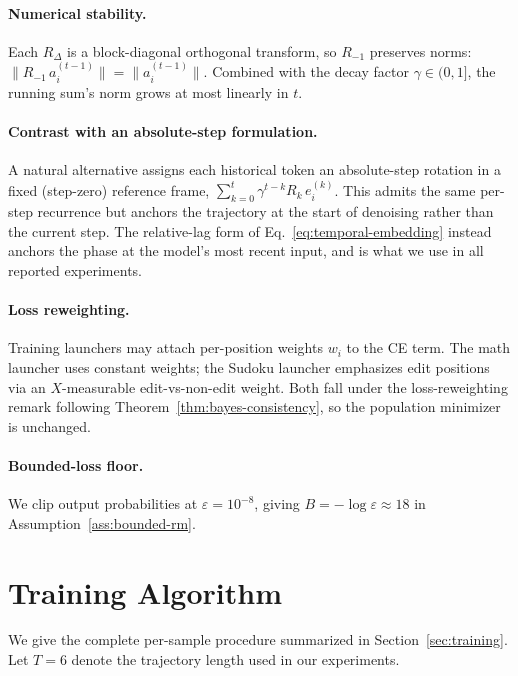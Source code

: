\documentclass{llmxive}
\begin{document}
\paragraph{Numerical stability.}
Each $R_\Delta$ is a block-diagonal orthogonal transform, so $R_{-1}$ preserves norms: $\|R_{-1}\, a_i^{(t-1)}\| = \|a_i^{(t-1)}\|$. Combined with the decay factor $\gamma \in (0, 1]$, the running sum's norm grows at most linearly in $t$.

\paragraph{Contrast with an absolute-step formulation.}
A natural alternative assigns each historical token an absolute-step rotation in a fixed (step-zero) reference frame, $\sum_{k=0}^{t} \gamma^{t-k} R_k\, e_i^{(k)}$. This admits the same per-step recurrence but anchors the trajectory at the start of denoising rather than the current step. The relative-lag form of Eq.~\eqref{eq:temporal-embedding} instead anchors the phase at the model's most recent input, and is what we use in all reported experiments.

\paragraph{Loss reweighting.}
Training launchers may attach per-position weights $w_i$ to the CE term. The math launcher uses constant weights; the Sudoku launcher emphasizes edit positions via an $X$-measurable edit-vs-non-edit weight. Both fall under the loss-reweighting remark following Theorem~\ref{thm:bayes-consistency}, so the population minimizer is unchanged.

\paragraph{Bounded-loss floor.}
We clip output probabilities at $\varepsilon = 10^{-8}$, giving $B = -\log\varepsilon \approx 18$ in Assumption~\ref{ass:bounded-rm}.


\section{Training Algorithm}
\label{app:training-algo}

We give the complete per-sample procedure summarized in Section~\ref{sec:training}. Let $T = 6$ denote the trajectory length used in our experiments.
\end{document}
